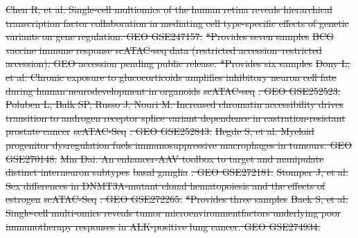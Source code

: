 \documentclass[referee, pdflatex, sn-vancouver-num]{sn-jnl}
\providecommand{\DIFdeltex}[1]{{\protect\color{red}\sout{#1}}}                      %
\providecommand{\DIFdel}[1]{\texorpdfstring{\DIFdeltex{#1}}{}} %
\begin{document}
\begin{appendices}
{	}%
\DIFdel{Chen R, et al. Single-cell multiomics of the human retina reveals hierarchical transcription factor collaboration in mediating cell type-specific effects of genetic variants on gene regulation. GEO GSE247157. }%
\DIFdel{*Provides seven samples
	}%
\DIFdel{BCG vaccine immune response scATAC-seq data (restricted accession--restricted accession). GEO accession pending public release. *Provides six samples
	}%
\DIFdel{Dony L, et al. Chronic exposure to glucocorticoids amplifies inhibitory neuron cell fate during human neurodevelopment in organoids }%
\DIFdel{scATAC-seq}%
\DIFdel{. GEO GSE252523. }%
\DIFdel{Poluben L, Balk SP, Russo J, Nouri M. Increased chromatin accessibility drives transition to androgen receptor splice variant dependence in castration-resistant prostate cancer }%
\DIFdel{scATAC-Seq}%
\DIFdel{. GEO GSE252843. }%
\DIFdel{Hegde S, et al. Myeloid progenitor dysregulation fuels immunosuppressive macrophages in tumours. GEO GSE270148. }%
\DIFdel{Min Dai. An enhancer-AAV toolbox to target and manipulate distinct interneuron subtypes }%
\DIFdel{basal ganglia}%
\DIFdel{. GEO GSE272181. }%
\DIFdel{Stomper J, et al. Sex differences in DNMT3A-mutant clonal hematopoiesis and the effects of estrogen }%
\DIFdel{scATAC-Seq}%
\DIFdel{. GEO GSE272265. }%
\DIFdel{*Provides three samples
	}%
\DIFdel{Baek S, et al. Single-cell multi-omics reveals tumor microenvironmentfactors underlying poor immunotherapy responses in ALK-positive lung cancer. GEO GSE274934. }%

\end{appendices}
\end{document}
